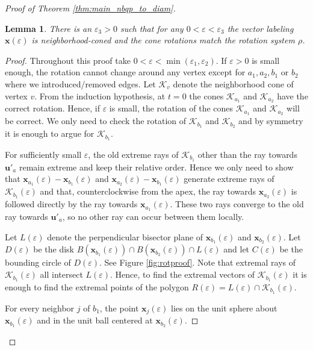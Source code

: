 \documentclass[10pt,a4paper]{article}
\newtheorem{lemma}[theorem]{Lemma}
\newcommand{\vu}[0]{\mathbf{u}}
\newcommand{\vx}[0]{\mathbf{x}}
\newcommand{\Kc}[0]{\mathcal{K}}
\begin{document}
\begin{proof}[Proof of Theorem \ref{thm:main_nbqp_to_diam}]
 
     

    \begin{lemma}\label{lem:checkingrotation}
        There is an $\varepsilon_3>0$ such that for any $0<\varepsilon<\varepsilon_3$ the vector labeling $\vx(\varepsilon)$ is neighborhood-coned and the cone rotations match the rotation system $\rho$. 
    \end{lemma}
    \begin{proof}

    
Throughout this proof take $0<\varepsilon<\min(\varepsilon_1,\varepsilon_2)$. 
If $\varepsilon>0$ is small enough, the rotation cannot change around any vertex except for $a_1,a_2,b_1$ or $b_2$ where we introduced/removed edges.
 Let $\Kc_v$ denote the neighborhood cone of vertex $v$. From the induction hypothesis, at $t=0$ the cones $\Kc_{a_1}$ and $\Kc_{a_2}$ have the correct rotation. Hence, if $\varepsilon$ is small, the rotation of the cones $\Kc_{a_1}$ and $\Kc_{a_2}$ will be correct. We only need to check the rotation of $\Kc_{b_1}$ and $\Kc_{b_2}$ and by symmetry it is enough to argue for $\Kc_{b_1}$. 

For sufficiently small $\varepsilon$, the old extreme rays of $\Kc_{b_1}$ other than the ray towards $\vu'_a$ remain extreme and keep their relative order. Hence we only need to show that $\vx_{a_1}(\varepsilon)-\vx_{b_1}(\varepsilon)$ and $\vx_{a_2}(\varepsilon)-\vx_{b_1}(\varepsilon)$ generate extreme rays of $\Kc_{b_1}(\varepsilon)$ and that, counterclockwise from the apex, the ray towards $\vx_{a_2}(\varepsilon)$ is followed directly by the ray towards $\vx_{a_1}(\varepsilon)$. These two rays converge to the old ray towards $\vu'_a$, so no other ray can occur between them locally.

 Let $L(\varepsilon)$ denote the perpendicular bisector plane of $\vx_{b_1}(\varepsilon)$ and $\vx_{b_2}(\varepsilon)$. Let $D(\varepsilon)$ be the disk $B(\vx_{b_1}(\varepsilon))\cap B(\vx_{b_2}(\varepsilon))\cap L(\varepsilon)$ and let $C(\varepsilon)$ be the bounding circle of $D(\varepsilon)$. See Figure \ref{fig:rotproof}. Note that extremal rays of $\Kc_{b_1}(\varepsilon)$ all intersect $L(\varepsilon)$. Hence, to find the extremal vectors of $\Kc_{b_1}(\varepsilon)$ it is enough to find the extremal points of the polygon $R(\varepsilon)=L(\varepsilon)\cap \Kc_{b_1}(\varepsilon)$. 

For every neighbor $j$ of $b_1$, the point $\vx_j(\varepsilon)$ lies on the unit sphere about $\vx_{b_1}(\varepsilon)$ and in the unit ball centered at $\vx_{b_2}(\varepsilon)$. 
    

\end{proof}
\end{proof}
\end{document}
